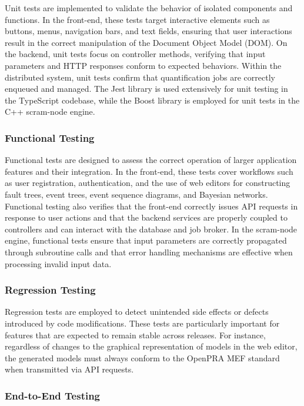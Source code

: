 Unit tests are implemented to validate the behavior of isolated components and functions. In the front-end, these tests target interactive elements such as buttons, menus, navigation bars, and text fields, ensuring that user interactions result in the correct manipulation of the Document Object Model (DOM). On the backend, unit tests focus on controller methods, verifying that input parameters and HTTP responses conform to expected behaviors. Within the distributed system, unit tests confirm that quantification jobs are correctly enqueued and managed. The Jest library is used extensively for unit testing in the TypeScript codebase, while the Boost library is employed for unit tests in the C++ scram-node engine.

\subsubsection{Functional Testing}

Functional tests are designed to assess the correct operation of larger application features and their integration. In the front-end, these tests cover workflows such as user registration, authentication, and the use of web editors for constructing fault trees, event trees, event sequence diagrams, and Bayesian networks. Functional testing also verifies that the front-end correctly issues API requests in response to user actions and that the backend services are properly coupled to controllers and can interact with the database and job broker. In the scram-node engine, functional tests ensure that input parameters are correctly propagated through subroutine calls and that error handling mechanisms are effective when processing invalid input data.

\subsubsection{Regression Testing}

Regression tests are employed to detect unintended side effects or defects introduced by code modifications. These tests are particularly important for features that are expected to remain stable across releases. For instance, regardless of changes to the graphical representation of models in the web editor, the generated models must always conform to the OpenPRA MEF standard when transmitted via API requests.

\subsubsection{End-to-End Testing}

